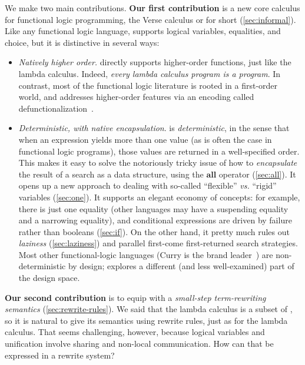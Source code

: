 \documentclass[acmsmall]{acmart}
\newcommand{\vs}{\emph{vs.}\xspace}
\begin{document}
We make two main contributions.
{\bf Our first contribution} is a new core calculus for functional logic programming,
the Verse calculus or \versecalc{} for short
(\cref{sec:informal}).
Like any functional logic language,
\versecalc{} supports logical variables, equalities, and choice, but it is distinctive in several ways:
\begin{itemize}
\item \emph{Natively higher order.} \versecalc{} directly supports higher-order functions, just like the lambda calculus.
  Indeed, \emph{every lambda calculus program is a \versecalc{} program}.
  In contrast, most of the functional logic literature is rooted in a first-order world, and
  addresses higher-order features via an encoding called defunctionalization~\cite[3.3]{hanus:survey}.
\item \emph{Deterministic, with native encapsulation}.  \versecalc{} is \emph{deterministic}, in the sense that when an expression yields more than one value (as is often the case in functional logic programs), those values are returned in a well-specified order.  This makes it easy to solve the notoriously tricky issue \cite{bernd-hanus:encapsulating} of
  how to \emph{encapsulate} the result of a search as a data structure, using the \ensuremath{\textbf{all}} operator (\cref{sec:all}).
  It opens up a new approach to dealing with so-called ``flexible'' {\vs} ``rigid'' variables
  (\cref{sec:one}).  It supports an elegant economy of concepts: for example,
  there is just one equality (other languages may have a suspending equality and a narrowing equality),
  and conditional expressions are driven by failure rather than booleans (\cref{sec:if}).
  On the other hand, it pretty much rules out \emph{laziness} (\cref{sec:laziness})
  and parallel first-come first-returned search strategies.
  Most other functional-logic languages (Curry is the brand leader~\cite{hanus:curry-report})
  are non-deterministic by design; \versecalc{}
  explores a different (and less well-examined) part of the design space.
\end{itemize}
{\bf Our second contribution} is to equip \versecalc{} with a
\emph{small-step term-rewriting semantics} (\cref{sec:rewrite-rules}).
We said that the lambda calculus is a subset of \versecalc{}, so it is natural to give its
semantics using rewrite rules, just as for the lambda calculus.  That seems challenging, however, because
logical variables and unification involve sharing and non-local communication. How can that
be expressed in a rewrite system?
\end{document}
